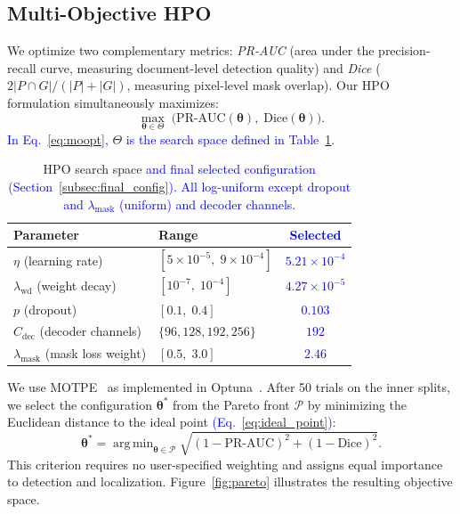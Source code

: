 \documentclass[final,5p,times,twocolumn,number]{elsarticle}
\DeclareMathOperator*{\argmin}{arg\,min}
\newcommand{\rev}[1]{\textcolor{blue}{#1}}
\begin{document}
\subsection{Multi-Objective HPO}
\label{subsec:hpo}

We optimize two complementary metrics: \emph{PR-AUC} (area under the
precision-recall curve, measuring document-level detection quality) and
\emph{Dice} ($2|P \cap G|/(|P|+|G|)$, measuring pixel-level mask overlap).
Our HPO formulation simultaneously maximizes:
\begin{equation}
  \max_{\boldsymbol{\theta} \in \Theta}\; \bigl(\text{PR-AUC}(\boldsymbol{\theta}),\;
  \text{Dice}(\boldsymbol{\theta})\bigr).
  \label{eq:moopt}
\end{equation}
\rev{In Eq.~\ref{eq:moopt},} $\Theta$ \rev{is the search space defined in
Table~\ref{tab:hpo_space}}.

\begin{table}[!t]
  \centering
  \caption{HPO search space \rev{and final selected configuration
           (Section~\ref{subsec:final_config}). All log-uniform except
           dropout and $\lambda_{\text{mask}}$ (uniform) and decoder
           channels}.}
  \label{tab:hpo_space}
  \begin{tabular}{llc}
    \toprule
    Parameter & Range & \rev{Selected} \\
    \midrule
    $\eta$ (learning rate) & $[5{\times}10^{-5},\; 9{\times}10^{-4}]$ & \rev{$5.21{\times}10^{-4}$} \\
    $\lambda_{\text{wd}}$ (weight decay) & $[10^{-7},\; 10^{-4}]$ & \rev{$4.27{\times}10^{-5}$} \\
    $p$ (dropout) & $[0.1,\; 0.4]$ & \rev{$0.103$} \\
    $C_{\text{dec}}$ (decoder channels) & $\{96, 128, 192, 256\}$ & \rev{$192$} \\
    $\lambda_{\text{mask}}$ (mask loss weight) & $[0.5,\; 3.0]$ & \rev{$2.46$} \\
    \bottomrule
  \end{tabular}
\end{table}

We use MOTPE~\citep{motpe2022} as implemented in Optuna~\citep{optuna2019}.
After 50 trials on the inner splits, we select the configuration
$\boldsymbol{\theta}^*$ from the Pareto front $\mathcal{P}$ by minimizing the
Euclidean distance to the ideal point \rev{(Eq.~\ref{eq:ideal_point})}:
\begin{equation}
  \boldsymbol{\theta}^* = \argmin_{\boldsymbol{\theta} \in \mathcal{P}}
    \sqrt{(1 - \text{PR-AUC})^2 + (1 - \text{Dice})^2}.
  \label{eq:ideal_point}
\end{equation}
This criterion requires no user-specified weighting and assigns equal importance
to detection and localization. Figure~\ref{fig:pareto} illustrates the
resulting objective space.
\end{document}
